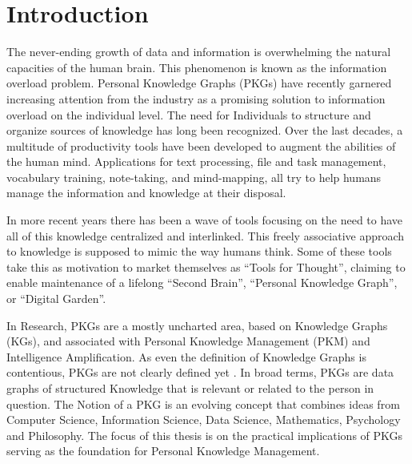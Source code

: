 \chapter{Introduction} \label{ch:introduction}

The never-ending growth of data and information is overwhelming the natural capacities of the human brain. This phenomenon is known as the information overload problem. Personal Knowledge Graphs (PKGs) have recently garnered increasing attention from the industry as a promising solution to information overload on the individual level. The need for Individuals to structure and organize sources of knowledge has long been recognized. Over the last decades, a multitude of productivity tools have been developed to augment the abilities of the human mind. Applications for text processing, file and task management, vocabulary training, note-taking, and mind-mapping, all try to help humans manage the information and knowledge at their disposal. 


In more recent years there has been a wave of tools focusing on the need to have all of this knowledge centralized and interlinked. This freely associative approach to knowledge is supposed to mimic the way humans think. Some of these tools take this as motivation to market themselves as “Tools for Thought”, claiming to enable maintenance of a lifelong “Second Brain”, “Personal Knowledge Graph”, or “Digital Garden”.

In Research, PKGs are a mostly uncharted area, based on Knowledge Graphs (KGs), and associated with Personal Knowledge Management (PKM) and Intelligence Amplification. As even the definition of Knowledge Graphs is contentious, PKGs are not clearly defined yet \cite{Hogan2021KG, commonsenseKG}. In broad terms, PKGs are data graphs of structured Knowledge that is relevant or related to the person in question. The Notion of a PKG is an evolving concept that combines ideas from Computer Science, Information Science, Data Science, Mathematics, Psychology and Philosophy. The focus of this thesis is on the practical implications of PKGs serving as the foundation for Personal Knowledge Management.





